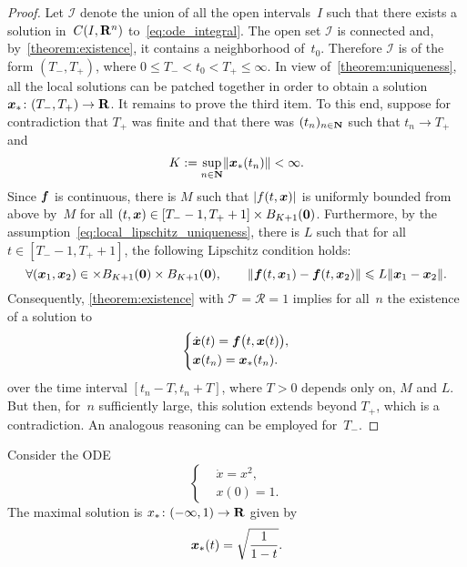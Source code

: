 \begin{proof}
    Let $\mathcal I$ denote the union of all the open intervals~$I$ such that there exists a solution in~$C(I, \mathbf R^n)$ to~\eqref{eq:ode_integral}.
    The open set $\mathcal I$ is connected and, by~\cref{theorem:existence},
    it contains a neighborhood of~$t_0$.
    Therefore $\mathcal I$ is of the form $(T_-, T_+)$,
    where $0 \leq T_- <  t_0 < T_+ \leq \infty$.
    In view of~\cref{theorem:uniqueness},
    all the local solutions can be patched together in order to obtain a solution~$\mathbf{\boldsymbol{x}}_*\colon (T_-, T_+) \to \mathbf R$.
    It remains to prove the third item.
    To this end, suppose for contradiction that $T_+$ was finite and that
    there was $(t_n)_{n \in \mathbf N}$ such that $t_n \to T_+$ and~
    \[
        K := \sup_{n \in \mathbf N} \lVert\mathbf{\boldsymbol{x}}_*(t_n)\rVert < \infty.
    \]
    Since $\mathbf{\boldsymbol{f}}$ is continuous,
    there is $M$ such that $\lvert f(t, \mathbf{\boldsymbol{x}}) \rvert$ is uniformly bounded from above by~$M$ for all $(t, \mathbf{\boldsymbol{x}}) \in [T_- - 1, T_+ + 1] \times B_{K+1}(\mathbf{\boldsymbol{0}})$.
    Furthermore, by the assumption~\eqref{eq:local_lipschitz_uniqueness},
    there is $L$ such that for all $t \in [T_- - 1, T_+ + 1]$,
    the following Lipschitz condition holds:
    \[
        \forall (\mathbf{\boldsymbol{x}}_1, \mathbf{\boldsymbol{x}}_2) \in  \times B_{K+1}(\mathbf{\boldsymbol{0}}) \times B_{K+1}(\mathbf{\boldsymbol{0}}), \qquad
        \lVert \mathbf{\boldsymbol{f}}(t, \mathbf{\boldsymbol{x}}_1) - \mathbf{\boldsymbol{f}}(t, \mathbf{\boldsymbol{x}}_2) \rVert \leqslant L \lVert\mathbf{\boldsymbol{x}}_1 - \mathbf{\boldsymbol{x}}_2\rVert.
    \]
    Consequently, \cref{theorem:existence} with $\mathcal T = \mathcal R = 1$ implies for all~$n$ the existence of a solution to
    \[
        \left \{
        \begin{aligned}
            & \dot {\mathbf{\boldsymbol{x}}}(t) = \mathbf{\boldsymbol{f}}\bigl(t, \mathbf{\boldsymbol{x}}(t)\bigr), \\
            & \mathbf{\boldsymbol{x}}(t_n) = \mathbf{\boldsymbol{x}}_*(t_n).
        \end{aligned}
        \right.
    \]
    over the time interval $[t_n - T, t_n + T]$, where $T > 0$ depends only on, $M$ and $L$.
    But then, for~$n$ sufficiently large,
    this solution extends beyond $T_+$,
    which is a contradiction.
    An analogous reasoning can be employed for~$T_-$.
\end{proof}
\begin{example}
    Consider the ODE
    \[
        \left \{
        \begin{aligned}
            & \dot x = x^2, \\
            & x(0) = 1.
        \end{aligned}
        \right.
    \]
    The maximal solution is $x_* \colon (-\infty, 1) \to \mathbf R$ given by
    \[
        \mathbf{\boldsymbol{x}}_*(t) = \sqrt{\frac{1}{1-t}}.
    \]
\end{example}

